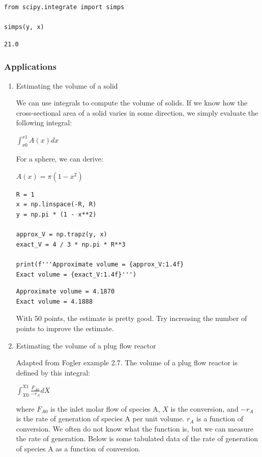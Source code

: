 \documentclass[11pt]{article}
\begin{document}
\begin{verbatim}
from scipy.integrate import simps

simps(y, x)
\end{verbatim}

\begin{verbatim}
21.0
\end{verbatim}

\subsubsection{Applications}
\label{sec:orgc035342}

\begin{enumerate}
\item Estimating the volume of a solid
\label{sec:org4977fcd}

We can use integrals to compute the volume of solids. If we know how the cross-sectional area of a solid varies in some direction, we simply evaluate the following integral:

\(\int_{x0}^{x1} A(x) dx\)

For a sphere, we can derive:

\(A(x) = \pi (1 - x^2)\)

\begin{verbatim}
R = 1
x = np.linspace(-R, R)
y = np.pi * (1 - x**2)

approx_V = np.trapz(y, x)
exact_V = 4 / 3 * np.pi * R**3

print(f'''Approximate volume = {approx_V:1.4f}
Exact volume = {exact_V:1.4f}''')
\end{verbatim}

\begin{verbatim}
Approximate volume = 4.1870
Exact volume = 4.1888

\end{verbatim}

With 50 points, the estimate is pretty good. Try increasing the number of points to improve the estimate.

\item Estimating the volume of a plug flow reactor
\label{sec:org4c72052}

Adapted from Fogler example 2.7. The volume of a plug flow reactor is defined by this integral:

\(\int_{X0}^{X1} \frac{F_{A0}}{-r_A} dX\)

where \(F_{A0}\) is the inlet molar flow of species A, \(X\) is the conversion, and \(-r_A\) is the rate of generation of species A per unit volume. \(r_A\)  is a function of conversion. We often do not know what the function is, but we can measure the rate of generation. Below is some tabulated data of the rate of generation of species A as a function of conversion.


\end{enumerate}
\end{document}
